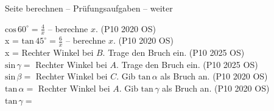 \begin{aufgabe}{Seite berechnen – Prüfungsaufgaben – weiter}
\begin{teile}
\teil $\mathrm{cos}\,60^\circ = \frac{4}{x}$ – berechne $x$. \hfill (P10 2020 OS) \\ x = \leerfeld
\teil $\mathrm{tan}\,45^\circ = \frac{6}{x}$ – berechne $x$. \hfill (P10 2020 OS) \\ x = \leerfeld
\teil Rechter Winkel bei $B$. Trage den Bruch ein. \hfill (P10 2025 OS) \\

$\mathrm{sin}\,\gamma =$ \leerfeld
\teil Rechter Winkel bei $A$. Trage den Bruch ein. \hfill (P10 2025 OS) \\

$\mathrm{sin}\,\beta =$ \leerfeld
\teil Rechter Winkel bei $C$. Gib $\mathrm{tan}\,\alpha$ als Bruch an. \hfill (P10 2020 OS) \\

$\mathrm{tan}\,\alpha =$ \leerfeld
\teil Rechter Winkel bei $A$. Gib $\mathrm{tan}\,\gamma$ als Bruch an. \hfill (P10 2020 OS) \\

$\mathrm{tan}\,\gamma =$ \leerfeld
\end{teile}
\end{aufgabe}
